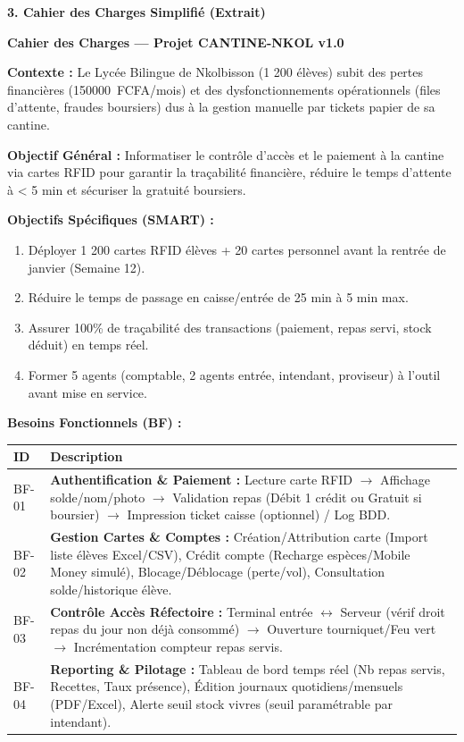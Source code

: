 \documentclass[11pt]{article}
\begin{document}
\begin{exoresolu}
\medskip
\textbf{3. Cahier des Charges Simplifié (Extrait)}

\textbf{Cahier des Charges — Projet CANTINE-NKOL v1.0}

\textbf{Contexte :} Le Lycée Bilingue de Nkolbisson (1 200 élèves) subit des pertes financières (\SI{150000}{FCFA}/mois) et des dysfonctionnements opérationnels (files d'attente, fraudes boursiers) dus à la gestion manuelle par tickets papier de sa cantine.

\textbf{Objectif Général :} Informatiser le contrôle d'accès et le paiement à la cantine via cartes RFID pour garantir la traçabilité financière, réduire le temps d'attente à < 5 min et sécuriser la gratuité boursiers.

\textbf{Objectifs Spécifiques (SMART) :}
\begin{enumerate}
    \item Déployer 1 200 cartes RFID élèves + 20 cartes personnel avant la rentrée de janvier (Semaine 12).
    \item Réduire le temps de passage en caisse/entrée de 25 min à 5 min max.
    \item Assurer 100\% de traçabilité des transactions (paiement, repas servi, stock déduit) en temps réel.
    \item Former 5 agents (comptable, 2 agents entrée, intendant, proviseur) à l'outil avant mise en service.
\end{enumerate}

\textbf{Besoins Fonctionnels (BF) :}
\begin{center}
\begin{tabularx}{\linewidth}{|l|X|}\hline
\rowcolor{popblueL}
\textbf{ID} & \textbf{Description} \\\hline
BF-01 & \textbf{Authentification \& Paiement :} Lecture carte RFID $\rightarrow$ Affichage solde/nom/photo $\rightarrow$ Validation repas (Débit 1 crédit ou Gratuit si boursier) $\rightarrow$ Impression ticket caisse (optionnel) / Log BDD. \\\hline
BF-02 & \textbf{Gestion Cartes \& Comptes :} Création/Attribution carte (Import liste élèves Excel/CSV), Crédit compte (Recharge espèces/Mobile Money simulé), Blocage/Déblocage (perte/vol), Consultation solde/historique élève. \\\hline
BF-03 & \textbf{Contrôle Accès Réfectoire :} Terminal entrée $\leftrightarrow$ Serveur (vérif droit repas du jour non déjà consommé) $\rightarrow$ Ouverture tourniquet/Feu vert $\rightarrow$ Incrémentation compteur repas servis. \\\hline
BF-04 & \textbf{Reporting \& Pilotage :} Tableau de bord temps réel (Nb repas servis, Recettes, Taux présence), Édition journaux quotidiens/mensuels (PDF/Excel), Alerte seuil stock vivres (seuil paramétrable par intendant). \\\hline
\end{tabularx}
\end{center}


\end{exoresolu}
\end{document}
